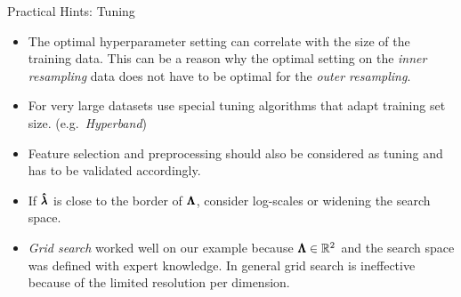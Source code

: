 \begin{frame}[allowframebreaks]{Practical Hints: Tuning}
\begin{itemize}
  \item The optimal hyperparameter setting can correlate with the size of the training data. This can be a reason why the optimal setting on the \emph{inner resampling} data does not have to be optimal for the \emph{outer resampling}.
  
  \item For very large datasets use special tuning algorithms that adapt training set size. (e.g.\ \emph{Hyperband})
  
  \item Feature selection and preprocessing should also be considered as tuning and has to be validated accordingly.
  
  \item If $\pmb{\hat{\lambda}}$ is close to the border of $\pmb{\Lambda}$, consider log-scales or widening the search space.
  
  \item \begin{minipage}[t]{.55\linewidth}\raggedright
          \emph{Grid search} worked well on our example because $\pmb{\Lambda} \in \mathbb{R}^2$ and the search space was defined with expert knowledge. In general grid search is ineffective because of the limited resolution per dimension.
        \end{minipage}%
        \begin{minipage}[t]{.4\linewidth}
        \end{minipage}


\end{itemize}
\end{frame}
